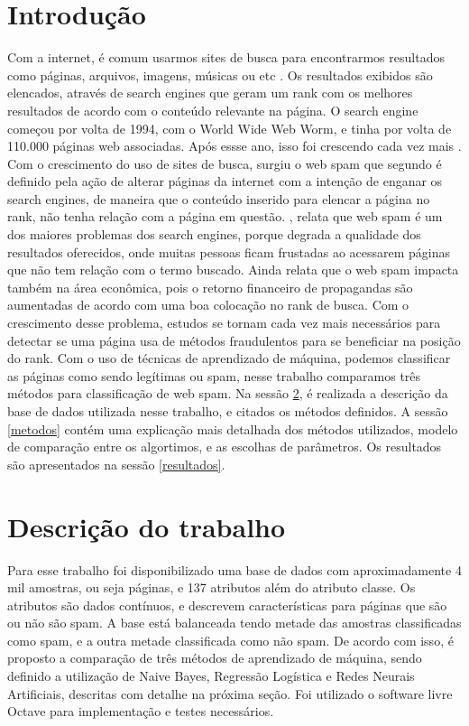 \documentclass[10pt, conference, compsocconf]{IEEEtran}
\begin{document}
\section{Introdução} 
Com a internet, é comum usarmos sites de busca para encontrarmos resultados como páginas, arquivos, imagens, músicas ou etc . Os resultados exibidos são elencados, através de search engines que geram um rank com os melhores resultados de acordo com o conteúdo relevante na página. O search engine começou por volta de 1994, com o World Wide Web Worm, e tinha por volta de 110.000 páginas web associadas. Após essse ano, isso foi crescendo cada vez mais \cite{1}.
Com o crescimento do uso de sites de busca, surgiu o web spam que segundo \cite{2} é definido pela ação de alterar páginas da internet com a intenção de enganar os search engines, de maneira que o conteúdo inserido para elencar a página no rank, não tenha relação com a página em questão.
\cite{3}, relata que web spam é um dos maiores problemas dos search engines, porque degrada a qualidade dos resultados oferecidos, onde muitas pessoas ficam frustadas ao acessarem páginas que não tem relação com o termo buscado. Ainda relata que o web spam impacta também na área econômica, pois o retorno financeiro de propagandas são aumentadas de acordo com uma boa colocação no rank de busca.
Com o crescimento desse problema, estudos se tornam cada vez mais necessários para detectar se uma página usa de métodos fraudulentos para se beneficiar na posição do rank. Com o uso de técnicas de aprendizado de máquina, podemos classificar as páginas como sendo legítimas ou spam, nesse trabalho comparamos três métodos para classificação de web spam.
Na sessão \ref{descricao}, é realizada a descrição da base de dados utilizada nesse trabalho, e citados os métodos definidos. A sessão \ref{metodos} contém uma explicação mais detalhada dos métodos utilizados, modelo de comparação entre os algortimos, e as escolhas de parâmetros. Os resultados são apresentados na sessão \ref{resultados}.

\section{Descrição do trabalho}\label{descricao} 
Para esse trabalho foi disponibilizado uma base de dados com aproximadamente 4 mil amostras, ou seja páginas, e 137 atributos além do atributo classe. Os atributos são dados contínuos, e  descrevem características para páginas que são ou não são spam. A base está balanceada tendo metade das amostras classificadas como spam, e a outra metade classificada como não spam.
De acordo com isso, é proposto a comparação de três métodos de aprendizado de máquina, sendo definido a utilização de Naive Bayes, Regressão Logística e Redes Neurais Artificiais, descritas com detalhe na próxima seção.
Foi utilizado o software livre Octave para implementação e testes necessários.
\end{document}
